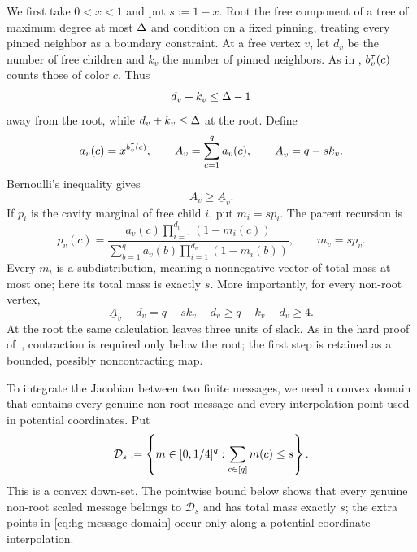 We first take $0<x<1$ and put $s:=1-x$.  Root the free component of a tree
of maximum degree at most \(\Delta\) and condition on a fixed pinning, treating
every pinned neighbor as a boundary constraint.  At a free vertex $v$, let
$d_v$ be the number of free children and $k_v$ the number of pinned
neighbors.  As in , $b_v^\tau(c)$ counts those of
color $c$.  Thus
\[
  d_v+k_v\le\Delta-1
\]
away from the root, while $d_v+k_v\le\Delta$ at the root.  Define
\begin{equation}
  a_v(c)=x^{b_v^\tau(c)},\qquad
  A_v=\sum_{c=1}^q a_v(c),\qquad
  \underline A_v=q-sk_v.
  \label{eq:hg-palette-mass}
\end{equation}
Bernoulli's inequality gives
\begin{equation}
  A_v\ge\underline A_v.
  \label{eq:hg-palette-lower}
\end{equation}
If $p_i$ is the cavity marginal of free child $i$, put $m_i=sp_i$.
The parent recursion is
\begin{equation}
  p_v(c)=
  \frac{a_v(c)\prod_{i=1}^{d_v}(1-m_i(c))}
       {\sum_{b=1}^q a_v(b)\prod_{i=1}^{d_v}(1-m_i(b))},
  \qquad m_v=sp_v.
  \label{eq:hg-scaled-recursion}
\end{equation}
Every $m_i$ is a subdistribution, meaning a nonnegative vector of total
mass at most one; here its total mass is exactly $s$.  More importantly,
for every non-root vertex,
\begin{equation}
  \underline A_v-d_v
    =q-sk_v-d_v
    \ge q-k_v-d_v\ge4.
  \label{eq:hg-four-slack}
\end{equation}
At the root the same calculation leaves three units of slack.  As in the hard
proof of~\cite{CLMM2023}, contraction is required only below the root; the
first step is retained as a bounded, possibly noncontracting map.

To integrate the Jacobian between two finite messages, we need a convex
domain that contains every genuine non-root message and every interpolation
point used in potential coordinates.  Put
\begin{equation}
 \mathcal D_s
 :=\left\{m\in[0,1/4]^q:
              \sum_{c\in[q]}m(c)\le s\right\}.
 \label{eq:hg-message-domain}
\end{equation}
This is a convex down-set.  The pointwise bound below shows that every
genuine non-root scaled message belongs to \(\mathcal D_s\) and has
total mass exactly \(s\); the extra points in
\eqref{eq:hg-message-domain} occur only along a potential-coordinate
interpolation.

